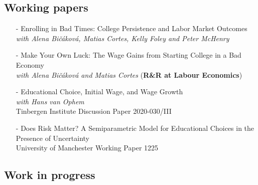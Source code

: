 \documentclass[11pt]{article}
\begin{document}
\nocite{fasani_mazza-ilrr}
\nocite{christl_et_al-fs}
\nocite{mazza_scipioni_jepp}
\nocite{bicakova_cortes_mazza_ej}
\nocite{mazza_vohpem_hartog_le}
\nocite{mazza_vophem_jrssa}

\hspace*{20pt}%
\begin{minipage}[t]{0.9\textwidth}%
\vspace{-.9cm}
    \centering
    \renewcommand\refname{}
        
        
\end{minipage}

\vspace{-.3cm}

\subsection*{\sc Working papers}

\begin{itemize}[itemsep=0pt, leftmargin=20pt]
\item[-]{Enrolling in Bad Times: College Persistence and Labor Market Outcomes}\\
	\emph{with Alena Bi\v{c}\'{a}kov\'{a}, Matias Cortes, Kelly Foley and Peter McHenry} 
\item [-]{Make Your Own Luck: The Wage Gains from Starting College in a Bad Economy}\\
\emph{with Alena Bi\v{c}\'{a}kov\'{a} and Matias Cortes} (\textbf{R\&R at Labour Economics})
\item [-]Educational Choice, Initial Wage, and Wage Growth\\
\emph{with Hans van Ophem}\\
Tinbergen Institute Discussion Paper 2020-030/III
\item [-]Does Risk Matter? A Semiparametric Model for Educational Choices in the Presence of Uncertainty \\
University of Manchester Working Paper 1225

\end{itemize}

\subsection*{\sc Work in progress}
\end{document}
